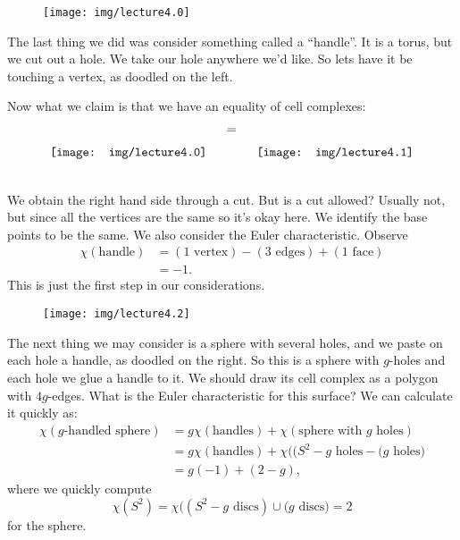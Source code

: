 

\begin{wrapfigure}{l}{0.868in}
  \vspace{-20pt}
  \texttt{[image: img/lecture4.0]}
  \vspace{-20pt}
\end{wrapfigure}
The last thing we did was consider something called a
``handle''. It is a torus, but we cut out a hole. We take our
hole anywhere we'd like. So lets have it be touching a vertex, as
doodled on the left.

Now what we claim is that we have an equality of cell complexes:
\begin{equation}
\texttt{[image: img/lecture4.0]}\quad
\begin{array}{c}
= \\
\quad \\
\quad \\
\quad\\
\end{array}\quad
\texttt{[image: img/lecture4.1]}
\vspace{-24pt}
\end{equation}
We obtain the right hand side through a cut. But is a cut
allowed? Usually not, but since all the vertices are the same so
it's okay here. We identify the base points to be the same. We
also consider the Euler characteristic. Observe
\begin{equation}
\begin{split}
\chi(\mbox{handle}) &= (\mbox{1 vertex})-(\mbox{3 edges})
+(\mbox{1 face})\\
&= -1.
\end{split}
\end{equation}
This is just the first step in our considerations.

\begin{wrapfigure}{r}{1.5in}
  \vspace{-20pt}
  \centering
  \texttt{[image: img/lecture4.2]}
  \vspace{-20pt}
\end{wrapfigure}
The next thing we may consider is a sphere with several holes,
and we paste on each hole a handle, as doodled on the right. So
this is a sphere with $g$-holes and each hole we glue a handle to
it. We should draw its cell complex as a polygon with
$4g$-edges. What is the Euler characteristic for this surface? We
can calculate it quickly as:
\begin{subequations}
\begin{align}
\chi(\mbox{$g$-handled sphere})
&=g\chi(\mbox{handles})+\chi(\mbox{sphere with $g$ holes})\\
&=g\chi(\mbox{handles})+\chi\bigl((S^{2}-\mbox{$g$ holes}-(\mbox{$g$ holes}\bigr)\\
&=g(-1)+(2-g),
\end{align}
\end{subequations}
where we quickly compute
\begin{equation}
\chi(S^{2})=\chi\bigl((S^{2}-\mbox{$g$ discs})\cup(\mbox{$g$ discs}\bigr)=2
\end{equation}
for the sphere.

